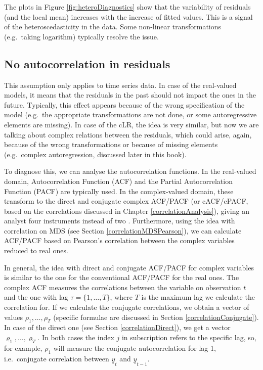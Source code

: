 \documentclass[
]{book}
\begin{document}
The plots in Figure \ref{fig:heteroDiagnostics} show that the variability of residuals (and the local mean) increases with the increase of fitted values. This is a signal of the heteroscedasticity in the data. Some non-linear transformations (e.g.~taking logarithm) typically resolve the issue.

\hypertarget{assumptionsResidualsAuto}{%
\subsection{No autocorrelation in residuals}\label{assumptionsResidualsAuto}}

This assumption only applies to time series data. In case of the real-valued models, it means that the residuals in the past should not impact the ones in the future. Typically, this effect appears because of the wrong specification of the model (e.g.~the appropriate transformations are not done, or some autoregressive elements are missing). In case of the cLR, the idea is very similar, but now we are talking about complex relations between the residuals, which could arise, again, because of the wrong transformations or because of missing elements (e.g.~complex autoregression, discussed later in this book).

To diagnose this, we can analyse the autocorrelation functions. In the real-valued domain, Autocorrelation Function (ACF) and the Partial Autocorrelation Function (PACF) are typically used. In the complex-valued domain, these transform to the direct and conjugate complex ACF/PACF (or cACF/cPACF, based on the correlations discussed in Chapter \ref{correlationAnalysis}), giving an analyst four instruments instead of two \citep{ACFPACFReferences}. Furthermore, using the idea with correlation on MDS (see Section \ref{correlationMDSPearson}), we can calculate ACF/PACF based on Pearson's correlation between the complex variables reduced to real ones.

In general, the idea with direct and conjugate ACF/PACF for complex variables is similar to the one for the conventional ACF/PACF for the real ones. The complex ACF measures the correlations between the variable on observation \(t\) and the one with lag \(\tau=\{1, \dots, T\}\), where \(T\) is the maximum lag we calculate the correlation for. If we calculate the conjugate correlations, we obtain a vector of values \(\rho_{1}, \dots, \rho_{T}\) (specific formulae are discussed in Section \ref{correlationConjugate}). In case of the direct one (see Section \ref{correlationDirect}), we get a vector \(\varrho_{1}, \dots, \varrho_{T}\). In both cases the index \(j\) in subscription refers to the specific lag, so, for example, \(\rho_{1}\) will measure the conjugate autocorrelation for lag 1, i.e.~conjugate correlation between \(\underline{y}_{t}\) and \(\underline{y}_{t-1}\).
\end{document}
